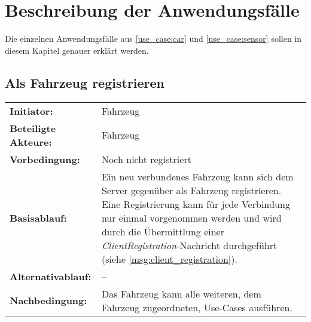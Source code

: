 \clearpage
\section{Beschreibung der Anwendungsfälle}

Die einzelnen Anwendungsfälle aus \autoref{use_case:car} und \autoref{use_case:sensor} sollen in diesem Kapitel genauer erklärt werden.

\newcommand{\usecasetablewidth}{11.5cm}
\newcommand{\usecase}[7]{\subsection{#1}
	\begin{tabular}[H]{lp{\usecasetablewidth}}
		\textbf{Initiator:} & #2 \\
		\textbf{Beteiligte Akteure:} & #3 \\
		\textbf{Vorbedingung:} & #4 \\
		\textbf{Basisablauf:} & #5 \\
		\textbf{Alternativablauf:} & #6 \\
		\textbf{Nachbedingung:} & #7 \\
	\end{tabular}
}
\newcommand{\usecaseWT}[8]{\subsection{#1}
	\begin{tabular}[H]{lp{\usecasetablewidth}}
		\textbf{Initiator:} & #2 \\
		\textbf{Auslöser:} & #3 \\
		\textbf{Beteiligte Akteure:} & #4 \\
		\textbf{Vorbedingung:} & #5 \\
		\textbf{Basisablauf:} & #6 \\
		\textbf{Alternativablauf:} & #7 \\
		\textbf{Nachbedingung:} & #8 \\
	\end{tabular}
}

\usecase{Als Fahrzeug registrieren}
	{Fahrzeug}
	{Fahrzeug}
	{Noch nicht registriert}
	{Ein neu verbundenes Fahrzeug kann sich dem Server gegenüber als Fahrzeug registrieren.
		Eine Registrierung kann für jede Verbindung  nur einmal vorgenommen werden und wird durch die Übermittlung einer \textit{ClientRegistration}-Nachricht durchgeführt (siehe \autoref{msg:client_registration}).}
	{--}
	{Das Fahrzeug kann alle weiteren, dem Fahrzeug zugeordneten, Use-Cases ausführen.}

